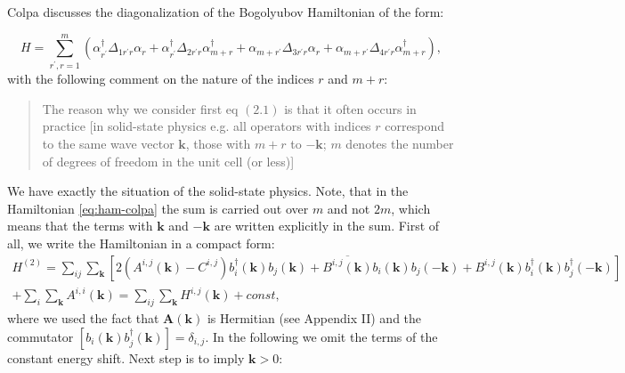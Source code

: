 \documentclass[a4paper,12pt]{article}
\begin{document}
            Colpa discusses the diagonalization of the Bogolyubov Hamiltonian of the form:

            \begin{equation}
                H = \sum_{r^{\prime}, r = 1}^m \left(\alpha_{r^{\prime}}^{\dag}\Delta_{1r^{\prime}r}\alpha_r +
                \alpha_{r^{\prime}}^{\dag}\Delta_{2r^{\prime}r}\alpha_{m+r}^{\dag} +
                \alpha_{m + r^{\prime}}\Delta_{3r^{\prime}r}\alpha_r +
                \alpha_{m + r^{\prime}}\Delta_{4r^{\prime}r}\alpha_{m + r}^{\dag}\right), \label{eq:ham-colpa}
            \end{equation}
            with the following comment on the nature of the indices $r$ and $m+r$:
            \begin{quote}
                The reason why we consider first eq $(2.1)$ is that it often occurs in practice 
                [in solid-state physics e.g. all operators with indices $r$ correspond to the same wave vector $\boldsymbol{k}$, 
                those with $m+r$ to $-\boldsymbol{k}$; $m$ denotes the number of degrees of freedom in the unit cell (or less)] 
            \end{quote}

            We have exactly the situation of the solid-state physics. Note, that in the Hamiltonian \eqref{eq:ham-colpa} the sum is carried out over $m$ and not $2m$, 
            which means that the terms with $\boldsymbol{k}$ and $-\boldsymbol{k}$ are written explicitly in the sum. 
            First of all, we write the Hamiltonian in a compact form:
            \begin{multline}
                H^{(2)} = \sum_{ij}\sum_{\boldsymbol{k}}\left[2(A^{i,j}(\boldsymbol{k}) - C^{i,j})b^{\dag}_{i}(\boldsymbol{k})b_{j}(\boldsymbol{k}) + 
                \overline{B^{i,j}(\boldsymbol{k})}b_{i}(\boldsymbol{k})b_{j}(-\boldsymbol{k}) +
                B^{i,j}(\boldsymbol{k})b^{\dag}_{i}(\boldsymbol{k})b^{\dag}_{j}(-\boldsymbol{k})\right]\\
                +\sum_i \sum_{\boldsymbol{k}} A^{i,i}(\boldsymbol{k}) 
                = \sum_{ij}\sum_{\boldsymbol{k}} H^{i,j}(\boldsymbol{k}) 
                + const, \label{eq:ham-simple}
            \end{multline}
            where we used the fact that $\boldsymbol{A}(\boldsymbol{k})$ is Hermitian (see Appendix II) and the commutator $[b_{i}(\boldsymbol{k})b^{\dag}_{j}(\boldsymbol{k})] = \delta_{i,j}$. 
            In the following we omit the terms of the constant energy shift. Next step is to imply $\boldsymbol{k}>0$:
\end{document}
